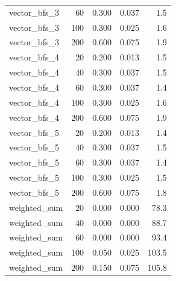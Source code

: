 \begin{tabular}{lrrrr}
vector\_bfs\_3 & 60 & 0.300 & 0.037 & 1.5 \\
vector\_bfs\_3 & 100 & 0.300 & 0.025 & 1.6 \\
vector\_bfs\_3 & 200 & 0.600 & 0.075 & 1.9 \\
vector\_bfs\_4 & 20 & 0.200 & 0.013 & 1.5 \\
vector\_bfs\_4 & 40 & 0.300 & 0.037 & 1.5 \\
vector\_bfs\_4 & 60 & 0.300 & 0.037 & 1.4 \\
vector\_bfs\_4 & 100 & 0.300 & 0.025 & 1.6 \\
vector\_bfs\_4 & 200 & 0.600 & 0.075 & 1.9 \\
vector\_bfs\_5 & 20 & 0.200 & 0.013 & 1.4 \\
vector\_bfs\_5 & 40 & 0.300 & 0.037 & 1.5 \\
vector\_bfs\_5 & 60 & 0.300 & 0.037 & 1.4 \\
vector\_bfs\_5 & 100 & 0.300 & 0.025 & 1.5 \\
vector\_bfs\_5 & 200 & 0.600 & 0.075 & 1.8 \\
weighted\_sum & 20 & 0.000 & 0.000 & 78.3 \\
weighted\_sum & 40 & 0.000 & 0.000 & 88.7 \\
weighted\_sum & 60 & 0.000 & 0.000 & 93.4 \\
weighted\_sum & 100 & 0.050 & 0.025 & 103.5 \\
weighted\_sum & 200 & 0.150 & 0.075 & 105.8 \\
\end{tabular}